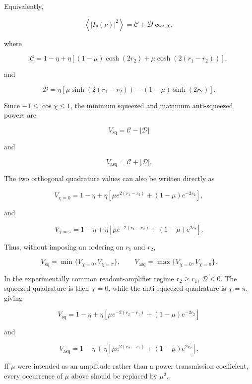 Equivalently,

\[
\left\langle |I_\theta(\nu)|^2\right\rangle =\mathcal C+\mathcal D\cos\chi,
\]

where

\[
\mathcal C = 1-\eta +\eta\left[ (1-\mu)\cosh(2r_2) +\mu\cosh\!\left(2(r_1-r_2)\right) \right],
\]

and

\[
\mathcal D = \eta\left[ \mu\sinh\!\left(2(r_1-r_2)\right) -(1-\mu)\sinh(2r_2) \right].
\]

Since $-1\leq\cos\chi\leq1$, the minimum squeezed and maximum anti-squeezed powers are

\[
{ V_{\mathrm{sq}}=\mathcal C-|\mathcal D| }
\]

and

\[
{ V_{\mathrm{asq}}=\mathcal C+|\mathcal D|. }
\]

The two orthogonal quadrature values can also be written directly as

\[
V_{\chi=0} = 1-\eta +\eta\left[ \mu e^{2(r_1-r_2)} +(1-\mu)e^{-2r_2} \right],
\]

and

\[
V_{\chi=\pi} = 1-\eta +\eta\left[ \mu e^{-2(r_1-r_2)} +(1-\mu)e^{2r_2} \right].
\]

Thus, without imposing an ordering on $r_1$ and $r_2$,

\[
V_{\mathrm{sq}}=\min\{V_{\chi=0},V_{\chi=\pi}\}, \qquad V_{\mathrm{asq}}=\max\{V_{\chi=0},V_{\chi=\pi}\}.
\]

In the experimentally common readout-amplifier regime $r_2\geq r_1$, $\mathcal D\leq0$. The squeezed quadrature is then $\chi=0$, while the anti-squeezed quadrature is $\chi=\pi$, giving

\[
{ V_{\mathrm{sq}} = 1-\eta +\eta\left[ \mu e^{-2(r_2-r_1)} +(1-\mu)e^{-2r_2} \right] }
\]

and

\[
{ V_{\mathrm{asq}} = 1-\eta +\eta\left[ \mu e^{2(r_2-r_1)} +(1-\mu)e^{2r_2} \right]. }
\]

If $\mu$ were intended as an amplitude rather than a power transmission coefficient, every occurrence of $\mu$ above should be replaced by $\mu^2$.

